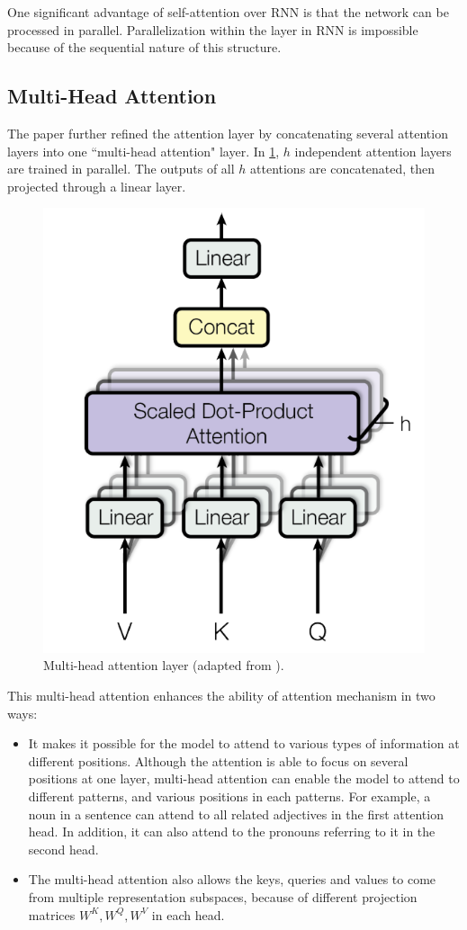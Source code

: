 One significant advantage of self-attention over RNN is that the network can be processed in parallel. Parallelization within the layer in RNN is impossible because of the sequential nature of this structure.

\subsection{Multi-Head Attention}

The paper further refined the attention layer by concatenating several attention layers into one ``multi-head attention" layer.
In \cref{fig:multihead-attention-layer}, $h$ independent attention layers are trained in parallel.
The outputs of all $h$ attentions are concatenated, then projected through a linear layer.

\begin{figure}[t]
    \centering
    \includegraphics[width=0.5\linewidth]{img/multihead-attention.png}
    \caption{Multi-head attention layer (adapted from \cite{DBLP:conf/nips/VaswaniSPUJGKP17}).}
    \label{fig:multihead-attention-layer}
\end{figure}

This multi-head attention enhances the ability of attention mechanism in two ways:
\begin{itemize}
    \item It makes it possible for the model to attend to various types of information at different positions. Although the attention is able to focus on several positions at one layer, multi-head attention can enable the model to attend to different patterns, and various positions in each patterns.
    For example, a noun in a sentence can attend to all related adjectives in the first attention head. In addition, it can also attend to the pronouns referring to it in the second head.
    \item The multi-head attention also allows the keys, queries and values to come from multiple representation subspaces, because of different projection matrices $W^K, W^Q, W^V$ in each head.
\end{itemize}

